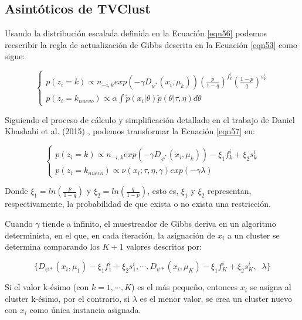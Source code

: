 \subsection{Asintóticos de TVClust}

Usando la distribución escalada definida en la Ecuación \ref{eqn56} podemos reescribir la regla de actualización de Gibbs descrita en la Ecuación \ref{eqn53} como sigue:

\begin{equation}
\begin{cases}
p(z_i = k) \varpropto n_{-i,k}exp(-\gamma D_{\psi^*}(x_i,\mu_k))\left(\frac{p}{1-q}\right)^{f_{k}^i} \left(\frac{1-p}{q}\right)^{s_{k}^i} \\
p(z_i = k_{nuevo}) \varpropto \alpha \int \widetilde{p}(x_i|\theta)\widetilde{p}(\theta|\tau, \eta)d\theta
\end{cases}
\label{eqn57}
\end{equation}

Siguiendo el proceso de cálculo y simplificación detallado en el trabajo de Daniel Khashabi et al. (2015) \cite{RDPM:2015}, podemos transformar la Ecuación \ref{eqn57} en:

\begin{equation}
\begin{cases}
p(z_i = k) \varpropto n_{-i,k}exp(-\gamma D_{\psi^*}(x_i,\mu_k)) - \xi_1 f_{k}^i + \xi_2 s_{k}^i \\
p(z_i = k_{nuevo}) \varpropto \nu(x_i; \tau, \eta, \gamma) exp(-\gamma \lambda)
\end{cases}
\label{eqn58}
\end{equation}

Donde $\xi_1 = ln\left(\frac{p}{1-q}\right)$ y $\xi_2 = ln\left(\frac{q}{1-p}\right)$, esto es, $\xi_1$ y $\xi_2$ representan, respectivamente, la probabilidad de que exista o no exista una restricción.

Cuando $\gamma$ tiende a infinito, el muestreador de Gibbs deriva en un algoritmo determinista, en el que, en cada iteración, la asignación de $x_i$ a un cluster se determina comparando los $K+1$ valores descritos por:

\begin{equation}
\{D_{\psi*}(x_i, \mu_1) - \xi_1 f_{1}^i  + \xi_2 s_{1}^i, \cdots, D_{\psi*}(x_i, \mu_K) - \xi_1 f_{K}^i + \xi_2 s_{K}^i, \;\; \lambda \}
\label{eqn59}
\end{equation}

Si el valor k-ésimo (con $k = 1, \cdots, K$) es el más pequeño, entonces $x_i$ se asigna al cluster k-ésimo, por el contrario, si $\lambda$ es el menor valor, se crea un cluster nuevo con $x_i$ como única instancia asignada.

